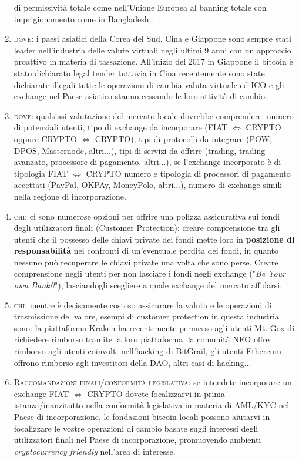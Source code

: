 \documentclass[11pt,fleqn,oneside]{book} %
\begin{document}
\begin{enumerate}
	di permissività totale come nell'Unione Europea al banning totale con imprigionamento come in Bangladesh \cite{bitcoinLegality}. 
	\item \textsc{dove}: i paesi asiatici della Corea del Sud, Cina e Giappone sono sempre stati leader nell'industria delle valute virtuali
	negli ultimi 9 anni con un approccio proattivo in materia di tassazione. All'inizio del 2017 in Giappone il bitcoin è stato 
	dichiarato legal tender tuttavia in Cina recentemente sono state dichiarate illegali tutte le operazioni di cambia valuta virtuale ed ICO 
	e gli exchange nel Paese asiatico stanno cessando le loro attività di cambio. 
	\item \textsc{dove}: qualsiasi valutazione del mercato locale dovrebbe comprendere: numero di potenziali utenti, tipo di exchange da 
	incorporare (FIAT $\Leftrightarrow$ CRYPTO oppure CRYPTO $\Leftrightarrow$ CRYPTO), tipi di protocolli da integrare (POW, DPOS, Masternode, altri...), 
	tipi di servizi da offrire (trading, trading avanzato, processore di pagamento, altri...), se l'exchange incorporato è di tipologia
	FIAT $\Leftrightarrow$ CRYPTO numero e tipologia di processori di pagamento accettati (PayPal, OKPAy, MoneyPolo, altri...), numero di exchange
	simili nella regione di incorporazione. 
	\item \textsc{chi}: ci sono numerose opzioni per offrire una polizza assicurativa sui fondi degli utilizzatori finali (Customer Protection):
	creare comprensione tra gli utenti che il possesso delle chiavi private dei fondi mette loro in \textbf{posizione di responsabilità} 
	nei confronti di un'eventuale perdita dei fondi, in quanto nessuno può recuperare le chiavi private una volta che sono perse. 
	Creare comprensione negli utenti per non lasciare i fondi negli exchange ("\textit{Be Your own Bank!!}"), lasciandogli scegliere a quale
	exchange del mercato affidarsi.
	\item \textsc{chi}: mentre è decisamente costoso assicurare la valuta e le operazioni di trasmissione del valore, esempi di customer protection
	in questa industria sono: la piattaforma Kraken ha recentemente permesso agli utenti Mt. Gox di richiedere rimborso tramite
	la loro piattaforma, la comunità NEO offre rimborso agli utenti coinvolti nell'hacking di BitGrail, gli utenti Ethereum
	offrono rimborso agli investitori della DAO, altri casi di hacking...
	\item \textsc{Raccomandazioni finali/conformità legislativa}: se intendete incorporare un exchange FIAT $\Leftrightarrow$ CRYPTO dovete focalizzarvi
	in prima istanza/inanzitutto nella conformità legislativa in materia di AML/KYC nel Paese di incorporazione, le fondazioni
	bitcoin locali possono aiutarvi in focalizzare le vostre operazioni di cambio basate sugli interessi degli utilizzatori finali 
	nel Paese di incorporazione, promuovendo ambienti \textit{cryptocurrency friendly} nell'area di interesse.
\end{enumerate}
\end{document}
